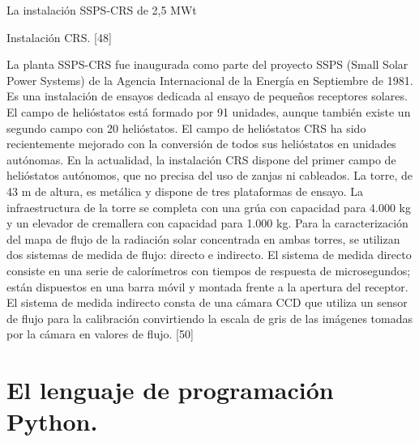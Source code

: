 \documentclass[12pt]{article}
\begin{document}
La instalación SSPS-CRS de 2,5 MWt


Instalación CRS. [48]

La planta SSPS-CRS fue inaugurada como parte del proyecto SSPS (Small Solar Power Systems) de la Agencia Internacional de la Energía en Septiembre de 1981.
Es una instalación de ensayos dedicada al ensayo de pequeños receptores solares. El campo de helióstatos está formado por 91 unidades, aunque también existe un segundo campo con 20 helióstatos.
El campo de helióstatos CRS ha sido recientemente mejorado con la conversión de todos sus helióstatos en unidades autónomas. En la actualidad, la instalación CRS dispone del primer campo de helióstatos autónomos, que no precisa del uso de zanjas ni cableados.
La torre, de 43 m de altura, es metálica y dispone de tres plataformas de ensayo.
La infraestructura de la torre se completa con una grúa con capacidad para 4.000 kg y un elevador de cremallera con capacidad para 1.000 kg.
Para la caracterización del mapa de flujo de la radiación solar concentrada en ambas torres, se utilizan dos sistemas de medida de flujo: directo e indirecto. El sistema de medida directo consiste en una serie de calorímetros con tiempos de respuesta de microsegundos; están dispuestos en una barra móvil y montada frente a la apertura del receptor. El sistema de medida indirecto consta de una cámara CCD que utiliza un sensor de flujo para la calibración convirtiendo la escala de gris de las imágenes tomadas por la cámara en valores de flujo. [50]



\section{El lenguaje de programación Python.}
\end{document}
